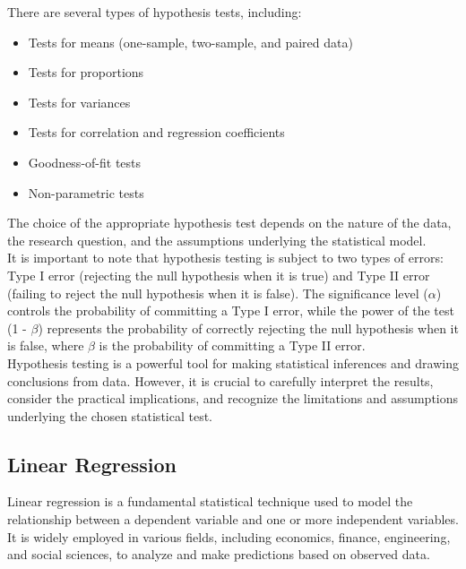 There are several types of hypothesis tests, including:
\begin{itemize}
    \item Tests for means (one-sample, two-sample, and paired data)
    \item Tests for proportions
    \item Tests for variances
    \item Tests for correlation and regression coefficients
    \item Goodness-of-fit tests
    \item Non-parametric tests
\end{itemize}
The choice of the appropriate hypothesis test depends on the nature of the data, the research question, and the assumptions underlying the statistical model.\\

It is important to note that hypothesis testing is subject to two types of errors: Type I error (rejecting the null hypothesis when it is true) and Type II error (failing to reject the null hypothesis when it is false). The significance level ($\alpha$) controls the probability of committing a Type I error, while the power of the test (1 - $\beta$) represents the probability of correctly rejecting the null hypothesis when it is false, where $\beta$ is the probability of committing a Type II error.\\

Hypothesis testing is a powerful tool for making statistical inferences and drawing conclusions from data. However, it is crucial to carefully interpret the results, consider the practical implications, and recognize the limitations and assumptions underlying the chosen statistical test.

\subsection{Linear Regression}
Linear regression is a fundamental statistical technique used to model the relationship between a dependent variable and one or more independent variables. It is widely employed in various fields, including economics, finance, engineering, and social sciences, to analyze and make predictions based on observed data.\\


